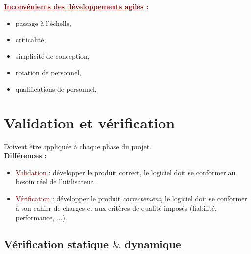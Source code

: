 \documentclass{article}
\newcommand{\rouge}[1]{\textcolor{darkred}{#1}}
\begin{document}
\begin{sffamily}
\begin{enumerate}
\rouge{\textbf{\underline{Inconvénients des développements agiles} :}} \\
\begin{itemize}
\item passage à l’échelle,
\item criticalité,
\item simplicité de conception,
\item rotation de personnel,
\item qualifications de personnel,
\end{itemize}

\end{enumerate}

\section{Validation et vérification}

Doivent être appliquée à chaque phase du projet.\\
\textbf{\underline{Différences} :} \\
\begin{itemize}
\item \rouge{Validation} : développer le produit correct, le logiciel doit se conformer au besoin réel de l'utilisateur.
\item \rouge{Vérification} : développer le produit \textit{correctement}, le logiciel doit se conformer à son cahier de charges 
et aux critères de qualité imposés (fiabilité, performance, ...).
\end{itemize}

\subsection{Vérification statique $\&$ dynamique}


\end{sffamily}
\end{document}
